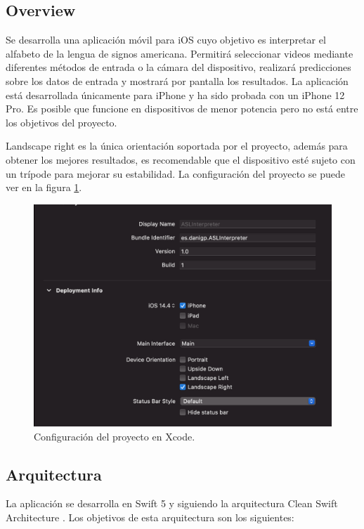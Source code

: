 \documentclass[../main.tex]{subfiles}
\begin{document}
\subsection{Overview}

Se desarrolla una aplicación móvil para iOS cuyo objetivo es interpretar el alfabeto de la lengua de signos americana. Permitirá seleccionar videos mediante diferentes métodos de entrada o la cámara del dispositivo, realizará predicciones sobre los datos de entrada y mostrará por pantalla los resultados. La aplicación está desarrollada únicamente para iPhone y ha sido probada con un iPhone 12 Pro. Es posible que funcione en dispositivos de menor potencia pero no está entre los objetivos del proyecto.

Landscape right es la única orientación soportada por el proyecto, además para obtener los mejores resultados, es recomendable que el dispositivo esté sujeto con un trípode para mejorar su estabilidad. La configuración del proyecto se puede ver en la figura \ref{figure18}.

\begin{figure}[h]
\centering 
\includegraphics[width=1\textwidth]{images/interpreter/config-project.png}
\caption{Configuración del proyecto en Xcode.}
\label{figure18}
\end{figure}

\subsection{Arquitectura}

La aplicación se desarrolla en Swift 5 y siguiendo la arquitectura Clean Swift Architecture \cite{cleanswift}. Los objetivos de esta arquitectura son los siguientes:
\end{document}
